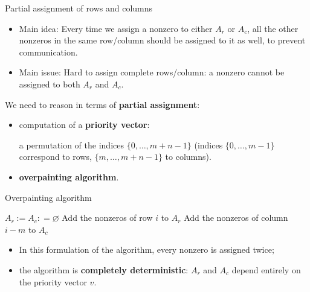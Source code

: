 \begin{frame}{Partial assignment of rows and columns}

\begin{itemize}
		\item	Main idea: Every time we assign a nonzero to either $A_r$ or $A_c$, all the other nonzeros in the same row/column should be assigned to it as well, to prevent communication.
		\item	Main issue: Hard to assign complete rows/column: a nonzero cannot be assigned to both $A_r$ and $A_c$.
\end{itemize}

We need to reason in terms of \textbf{partial assignment}:

	\begin{itemize}
		\item	computation of a \textbf{priority vector}:
			
			a permutation of the indices $\{0,\dots,m+n-1\}$ (indices $\{0,\dots,m-1\}$ correspond to rows, $\{m,\dots,m+n-1\}$ to columns).
		\item \textbf{overpainting algorithm}.
	\end{itemize}
\end{frame}


\begin{frame}{Overpainting algorithm}
\begin{algorithm}[H]
	\begin{algorithmic}
		\State $A_r := A_c: = \varnothing$
	\State Add the nonzeros of row $i$ to $A_r$
	\Else
	\State Add the nonzeros of column $i-m$ to $A_c$
	\EndIf
	\EndFor
\end{algorithmic}
\end{algorithm}

\vspace{-0.4cm}

\begin{itemize}
	\item In this formulation of the algorithm, every nonzero is assigned twice;
	\item the algorithm is \textbf{completely deterministic}: $A_r$ and $A_c$ depend entirely on the priority vector $v$.
\end{itemize}

\end{frame}

